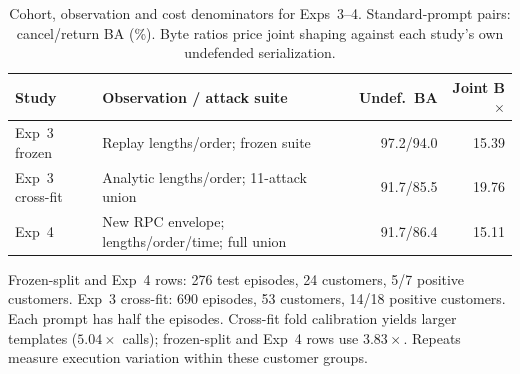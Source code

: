 \begin{table}[t]\centering\footnotesize
\caption{Cohort, observation and cost denominators for Exps~3--4. Standard-prompt pairs: cancel/return BA (\%). Byte ratios price joint shaping against each study's own undefended serialization.}\label{tab:r7-cohorts}
\begin{tabularx}{\columnwidth}{@{}lYrr@{}}\toprule
Study & Observation / attack suite & Undef.\ BA & Joint B$\times$\\\midrule
Exp~3 frozen & Replay lengths/order; frozen suite & 97.2/94.0 & 15.39\\
Exp~3 cross-fit & Analytic lengths/order; 11-attack union & 91.7/85.5 & 19.76\\
Exp~4 & New RPC envelope; lengths/order/time; full union & 91.7/86.4 & 15.11\\\bottomrule
\end{tabularx}
\par\smallskip\raggedright\footnotesize Frozen-split and Exp~4 rows: 276 test episodes, 24 customers, 5/7 positive customers. Exp~3 cross-fit: 690 episodes, 53 customers, 14/18 positive customers. Each prompt has half the episodes. Cross-fit fold calibration yields larger templates ($5.04\times$ calls); frozen-split and Exp~4 rows use $3.83\times$. Repeats measure execution variation within these customer groups.
\end{table}
